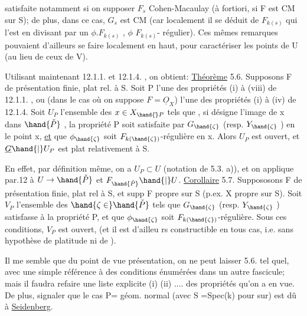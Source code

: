 
satisfaite notamment si on supposer $F_s$ Cohen-Macaulay (à fortiori, si
F est CM sur S); de plus, dans ce cas, $G_s$ est CM (car localement il se
déduit de $F_{k(s)}$ qui l'est en divisant par un $\phi . F_{k(s)}$ ,   $\phi$  $F_{k(s)}$-%
régulier). Ces mêmes remarques pouvaient  d'ailleurs se faire localement
en haut, pour caractériser les points de U (au lieu de ceux de V).

Utilisant maintenant 12.1.1. et 12.1.4. , on obtient:
\uline{Théorème} 5.6. Supposons F de présentation finie, plat rel. à S. Soit
P l'une des propriétés 
 (i) à (viii) de 12.1.1. ,
ou  (dans le cas où on suppose $F=\underline{O}_X$) l'une des
 propriétés (i) à (iv)\hand{/} de 12.1.4. Soit
 $U_P$  l'ensemble des $x \in X_{\hand{\check{}}P}$ tels que , si \hand{$\zeta$}
 désigne l'image de x dans $\hand{\check{P}}$ , la propriété P soit satisfaite
par $G_{\hand{\zeta}}$ (resp.  $Y_{\hand{\zeta}}$ ) en le point x, \uline{et} que $\phi_{\hand{\zeta}}$ soit $F_{k(\hand{\zeta})}$-régulière en x.
Alors $U_P$ est ouvert, et $\underline{G}\hand{|}U_P$ est plat relativement à S.

En effet, par définition même, on a $U_P \subset U$ (notation de 5.3. a)),
et on applique par.12 à $U \to \hand{\check{P}}$ et $F_{\hand{\check{P}}}\hand{|}U$.
\uline{Corollaire} 5.7. Suppososons F de présentation finie, plat rel à S,
et supp F propre sur S (p.ex. X propre sur S). Soit $V_P$ l'ensemble des
$\hand{\zeta\in}\hand{\check{P}}$ tels que $G_{\hand{\zeta}}$ (resp. $Y_{\hand{\zeta}}$ ) satisfasse à la propriété P, et que $\phi_{\hand{\zeta}}$ soit
$F_{k(\hand{\zeta})}$-régulière. Sous ces conditions, $V_P$ est ouvert, (et il est d'ailleu
rs constructible en tous cas, i.e. sans hypothèse de platitude ni de
).

Il me semble que du point de vue présentation, on ne peut laisser
5.6. tel quel, avec une simple référence à des conditions énumérées dans
un autre fascicule; mais il faudra refaire une liste explicite (i) (ii)
.... des propriétés qu'on a en vue. De plus, signaler  que le cas P= géom.
normal (avec S =Spec(k) pour sur) est dû à \uline{Seidenberg}.


